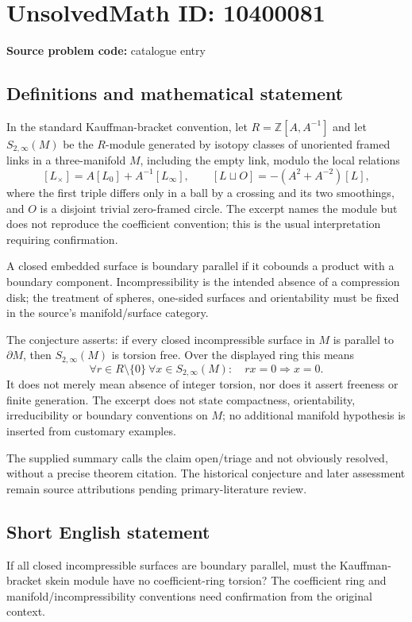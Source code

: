 \documentclass[11pt]{article}
\begin{document}
\section*{UnsolvedMath ID: 10400081}
\textbf{Source problem code:} catalogue entry
\subsection{Definitions and mathematical statement}
In the standard Kauffman-bracket convention, let \(R=\mathbb Z[A,A^{-1}]\) and let \(S_{2,\infty}(M)\) be the \(R\)-module generated by isotopy classes of unoriented framed links in a three-manifold \(M\), including the empty link, modulo the local relations
\[
 [L_\times]=A[L_0]+A^{-1}[L_\infty],\qquad
 [L\sqcup O]=-(A^2+A^{-2})[L],
\]
where the first triple differs only in a ball by a crossing and its two smoothings, and \(O\) is a disjoint trivial zero-framed circle. The excerpt names the module but does not reproduce the coefficient convention; this is the usual interpretation requiring confirmation.

A closed embedded surface is boundary parallel if it cobounds a product with a boundary component. Incompressibility is the intended absence of a compression disk; the treatment of spheres, one-sided surfaces and orientability must be fixed in the source's manifold/surface category.

The conjecture asserts: if every closed incompressible surface in \(M\) is parallel to \(\partial M\), then \(S_{2,\infty}(M)\) is torsion free. Over the displayed ring this means
\[
 \forall r\in R\setminus\{0\}\ \forall x\in S_{2,\infty}(M):
 \quad rx=0\Longrightarrow x=0.
\]
It does not merely mean absence of integer torsion, nor does it assert freeness or finite generation. The excerpt does not state compactness, orientability, irreducibility or boundary conventions on \(M\); no additional manifold hypothesis is inserted from customary examples.

The supplied summary calls the claim open/triage and not obviously resolved, without a precise theorem citation. The historical conjecture and later assessment remain source attributions pending primary-literature review.
\subsection{Short English statement}
If all closed incompressible surfaces are boundary parallel, must the Kauffman-bracket skein module have no coefficient-ring torsion? The coefficient ring and manifold/incompressibility conventions need confirmation from the original context.
\end{document}

